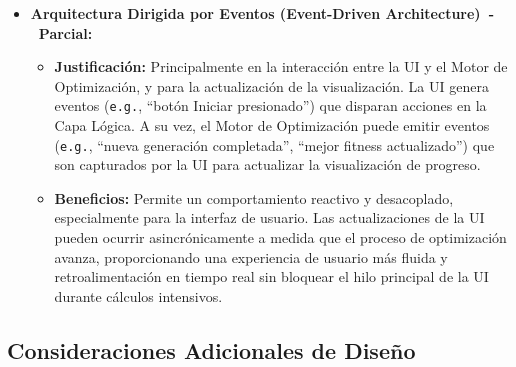\begin{itemize}
    \item \textbf{Arquitectura Dirigida por Eventos (Event-Driven Architecture)~-~Parcial:}
    \begin{itemize}
        \item \textbf{Justificación:} Principalmente en la interacción entre la UI y el Motor de Optimización, y para la actualización de la visualización. La UI genera eventos (\texttt{e.g.}, ``botón Iniciar presionado'') que disparan acciones en la Capa Lógica. A su vez, el Motor de Optimización puede emitir eventos (\texttt{e.g.}, ``nueva generación completada'', ``mejor fitness actualizado'') que son capturados por la UI para actualizar la visualización de progreso.
        \item \textbf{Beneficios:} Permite un comportamiento reactivo y desacoplado, especialmente para la interfaz de usuario. Las actualizaciones de la UI pueden ocurrir asincrónicamente a medida que el proceso de optimización avanza, proporcionando una experiencia de usuario más fluida y retroalimentación en tiempo real sin bloquear el hilo principal de la UI durante cálculos intensivos.
    \end{itemize}
\end{itemize}

\subsection{Consideraciones Adicionales de Diseño}

